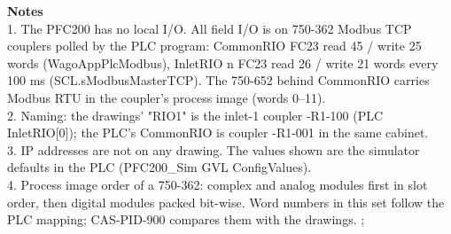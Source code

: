 {{    \textbf{Notes}\\[1mm]
    1. The PFC200 has no local I/O. All field I/O is on 750-362 Modbus TCP couplers polled by the PLC program:
       CommonRIO FC23 read 45 / write 25 words (WagoAppPlcModbus), InletRIO n FC23 read 26 / write 21
       words every 100 ms (SCL.sModbusMasterTCP). The 750-652 behind CommonRIO carries Modbus RTU in the
       coupler's process image (words 0--11).\\[0.8mm]
    2. Naming: the drawings' "RIO1" is the inlet-1 coupler -R1-100 (PLC InletRIO[0]); the PLC's CommonRIO is
       coupler -R1-001 in the same cabinet.\\[0.8mm]
    3. IP addresses are not on any drawing. The values shown are the simulator defaults in the PLC
       (PFC200\_Sim GVL ConfigValues).\\[0.8mm]
    4. Process image order of a 750-362: complex and analog modules first in slot order, then digital
       modules packed bit-wise. Word numbers in this set follow the PLC mapping; CAS-PID-900 compares
       them with the drawings.
  };
}
